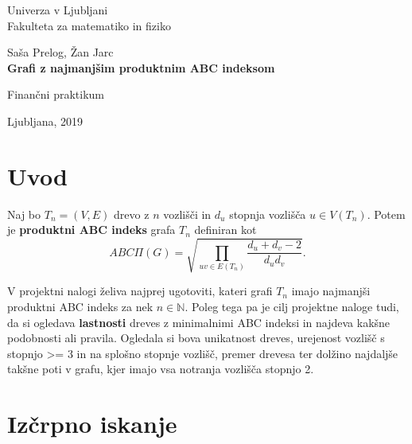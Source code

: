 \documentclass[a4paper,12 pt]{article}
\begin{document}
\begin{titlepage}
\begin{center}

\large
Univerza v Ljubljani\\
\normalsize
Fakulteta za matematiko in fiziko\\

\vspace{3 cm} 

\large
Saša Prelog, Žan Jarc\\

\vspace{0.5cm}
\LARGE
\textbf{Grafi z najmanjšim  produktnim ABC indeksom}

\vspace{0.5 cm}
\normalsize
Finančni praktikum



\vspace{3cm}


\vfill

\large Ljubljana, 2019

\end{center}
\end{titlepage}

\newpage

\tableofcontents
\vspace{20mm}

\newpage

\section[Uvod]{Uvod}

Naj bo $T_n = (V, E)$ drevo z $n$ vozlišči in $d_u$ stopnja vozlišča $u \in V(T_n)$. Potem je \textbf{produktni ABC indeks} grafa $T_n$ definiran kot
$$
ABC \Pi (G) = \sqrt{ {\displaystyle \prod_{uv \in E(T_n)}} \frac{d_u + d_v - 2}{d_u d_v}}.
$$

V projektni nalogi želiva najprej ugotoviti, kateri grafi $T_n$ imajo najmanjši produktni ABC indeks za nek $n \in \mathbb{N}$. Poleg tega pa je cilj projektne naloge tudi, da si ogledava \textbf{lastnosti} dreves z minimalnimi ABC indeksi in najdeva kakšne podobnosti ali pravila. Ogledala si bova unikatnost dreves, urejenost vozlišč s stopnjo >= 3 in na splošno stopnje vozlišč, premer drevesa ter dolžino najdaljše takšne poti v grafu, kjer imajo vsa notranja vozlišča stopnjo 2.

\section[Izčrpno iskanje]{Izčrpno iskanje}
\end{document}
